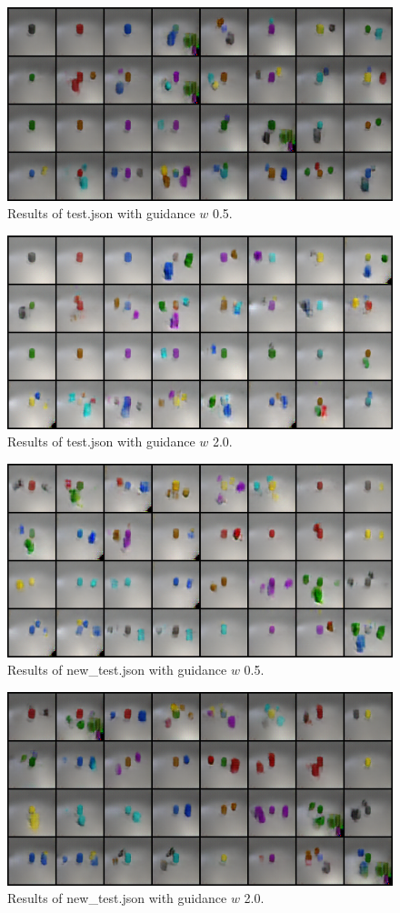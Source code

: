 	\begin{figure}[H]
		\centering
		\includegraphics[width=\textwidth]{img/test_w0.5.png}
		\caption{Results of test.json with guidance $w$ 0.5.}
		\label{img-test-0.5}
	\end{figure}
	\begin{figure}[H]
		\centering
		\includegraphics[width=\textwidth]{img/test_w2.0.png}
		\caption{Results of test.json with guidance $w$ 2.0.}
		\label{img-test-2.0}
	\end{figure}
	\begin{figure}[H]
		\centering
		\includegraphics[width=\textwidth]{img/new_test_w0.5.png}
		\caption{Results of new\_test.json with guidance $w$ 0.5.}
		\label{img-new-test-0.5}
	\end{figure}
	\begin{figure}[H]
		\centering
		\includegraphics[width=\textwidth]{img/new_test_w2.0.png}
		\caption{Results of new\_test.json with guidance $w$ 2.0.}
		\label{img-new-test-2.0}
	\end{figure}
